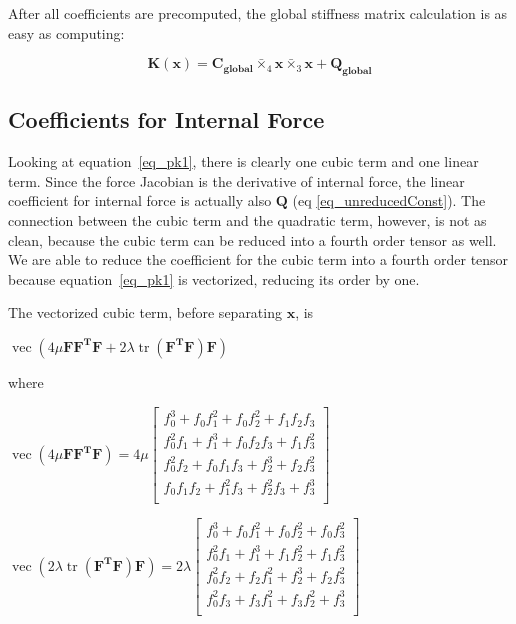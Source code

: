 \documentclass[twocolumn,10pt]{asme2ej}
\DeclareMathOperator{\vect}{vec}
\DeclareMathOperator{\tr}{tr}
\begin{document}
After all coefficients are precomputed, the global stiffness matrix calculation is as easy as computing:

\begin{equation}
  \bm{K}(\bm{x}) = \bm{C_{global}} \bar{\times}_4 \bm{x} \bar{\times}_3 \bm{x} + \bm{Q_{global}}
\end{equation}

\subsection{Coefficients for Internal Force}

Looking at equation~\ref{eq_pk1}, there is clearly one cubic term and one linear term. Since the force Jacobian is the derivative of internal force, the linear coefficient for internal force is actually also $\bm{Q}$ (eq \ref{eq_unreducedConst}). The connection between the cubic term and the quadratic term, however, is not as clean, because the cubic term can be reduced into a fourth order tensor as well. We are able to reduce the coefficient for the cubic term into a fourth order tensor because equation~\ref{eq_pk1} is vectorized, reducing its order by one.

The vectorized cubic term, before separating $\bm{x}$, is

\begin{center}
  $\vect \left( 4\mu\bm{FF^TF} + 2\lambda\tr\left(\bm{F^TF}\right)\bm{F}\right)$
\end{center}

where

\begin{center}
  $\vect \left( 4\mu\bm{FF^TF} \right) = 4\mu
  \begin{bmatrix}
    f_{0}^3 + f_0f_{1}^2 + f_0f_{2}^2 + f_1f_2f_3 \\
    f_{0}^2f_{1} + f_{1}^3 + f_0f_2f_3 + f_1f_{3}^2 \\
    f_{0}^2f_{2} + f_0f_1f_3 + f_{2}^3 + f_2f_{3}^2 \\
    f_0f_1f_2 + f_{1}^2f_3 + f_{2}^2f_3 + f_{3}^3 \\
    \end{bmatrix}$

    \bigskip
    $\vect \left( 2\lambda\tr\left(\bm{F^TF}\right)\bm{F} \right) = 2\lambda
    \begin{bmatrix}
      f_{0}^3 + f_0f_{1}^2 + f_0f_{2}^2 + f_0f_{3}^2 \\
      f_{0}^2f_1 + f_{1}^3 + f_1f_{2}^2 + f_1f_{3}^2 \\
      f_{0}^2f_2 + f_2f_{1}^2 + f_{2}^3 + f_2f_{3}^2 \\
      f_{0}^2f_3 + f_3f_{1}^2 + f_3f_{2}^2 + f_{3}^3\\
      \end{bmatrix}$
\end{center}
\end{document}
